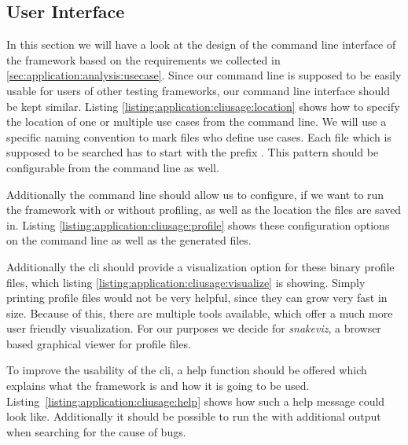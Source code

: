 \subsection{User Interface}

In this section we will have a look at the design of the command line interface
of the framework based on the requirements we collected in
\ref{sec:application:analysis:usecase}. Since our command line is supposed to be
easily usable for users of other testing frameworks, our command line interface
should be kept similar. Listing \ref{listing:application:cliusage:location}
shows how to specify the location of one or multiple use cases from the command
line. We will use a specific naming convention to mark files who define use
cases. Each file which is supposed to be searched has to start with the prefix
. This pattern should be configurable from the command
line as well.



Additionally the command line should allow us to configure, if we want to run
the framework with or without profiling, as well as the location the files are
saved in. Listing \ref{listing:application:cliusage:profile} shows these
configuration options on the command line as well as the generated files.



Additionally the \gls{cli} should provide a visualization option for these binary
profile files, which listing \ref{listing:application:cliusage:visualize} is
showing. Simply printing profile files would not be very helpful, since they can
grow very fast in size. Because of this, there are multiple tools available,
which offer a much more user friendly visualization. For our purposes we decide
for \emph{snakeviz}, a browser based graphical viewer for profile files.
\cite{Snakeviz}

To improve the usability of the \gls{cli}, a help function should be offered which
explains what the framework is and how it is going to be used.
Listing \ref{listing:application:cliusage:help} shows how such a help message
could look like. Additionally it should be possible to run the  with
additional output when searching for the cause of bugs. 

